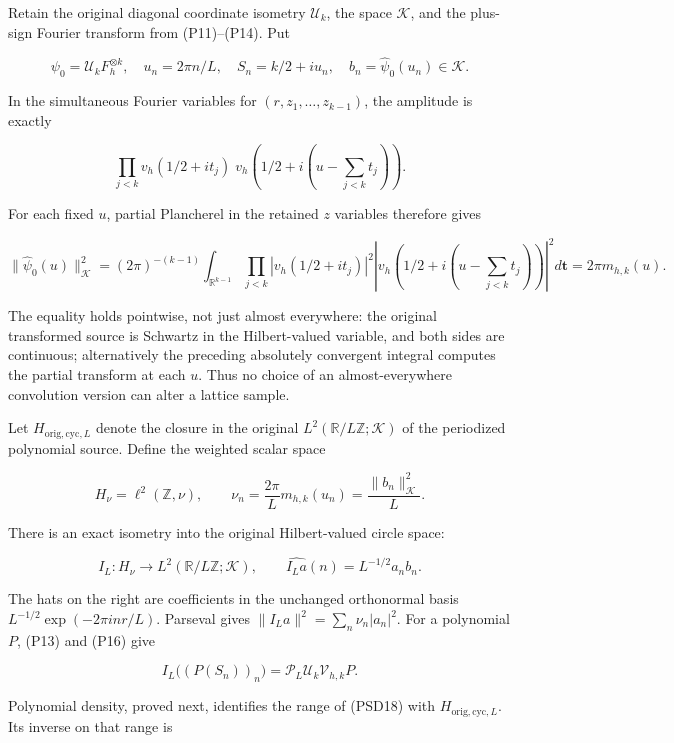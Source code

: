 Retain the original diagonal coordinate isometry \(\mathcal U_k\), the space \(\mathcal K\), and the plus-sign Fourier transform from (P11)--(P14). Put

\[
\psi_0=\mathcal U_kF_h^{\otimes k},\quad
u_n=2\pi n/L,\quad S_n=k/2+iu_n,\quad
b_n=\widehat\psi_0(u_n)\in\mathcal K.
\]

In the simultaneous Fourier variables for \((r,z_1,\ldots,z_{k-1})\), the amplitude is exactly

\[
\prod_{j<k}v_h(1/2+it_j)\;
v_h\left(1/2+i\left(u-\sum_{j<k}t_j\right)\right).
\]

For each fixed \(u\), partial Plancherel in the retained \(z\) variables therefore gives

\[
\|\widehat\psi_0(u)\|_{\mathcal K}^2
=(2\pi)^{-(k-1)}\int_{\mathbb R^{k-1}}
\prod_{j<k}|v_h(1/2+it_j)|^2
\left|v_h\left(1/2+i\left(u-\sum_{j<k}t_j\right)\right)\right|^2d\mathbf t
=2\pi m_{h,k}(u).
\tag{PSD16}
\]

The equality holds pointwise, not just almost everywhere: the original transformed source is Schwartz in the Hilbert-valued variable, and both sides are continuous; alternatively the preceding absolutely convergent integral computes the partial transform at each \(u\). Thus no choice of an almost-everywhere convolution version can alter a lattice sample.

Let \(H_{\mathrm{orig,cyc},L}\) denote the closure in the original \(L^2(\mathbb R/L\mathbb Z;\mathcal K)\) of the periodized polynomial source. Define the weighted scalar space

\[
H_\nu=\ell^2(\mathbb Z,\nu),\qquad
\nu_n=\frac{2\pi}{L}m_{h,k}(u_n)=\frac{\|b_n\|_{\mathcal K}^2}{L}.
\tag{PSD17}
\]

There is an exact isometry into the original Hilbert-valued circle space:

\[
I_L:H_\nu\longrightarrow L^2(\mathbb R/L\mathbb Z;\mathcal K),
\qquad \widehat{I_La}(n)=L^{-1/2}a_nb_n.
\tag{PSD18}
\]

The hats on the right are coefficients in the unchanged orthonormal basis \(L^{-1/2}\exp(-2\pi i nr/L)\). Parseval gives \(\|I_La\|^2=\sum_n\nu_n|a_n|^2\). For a polynomial \(P\), (P13) and (P16) give

\[
I_L\bigl((P(S_n))_n\bigr)
=\mathcal P_L\mathcal U_k\mathcal V_{h,k}P.
\tag{PSD19}
\]

Polynomial density, proved next, identifies the range of (PSD18) with \(H_{\mathrm{orig,cyc},L}\). Its inverse on that range is


